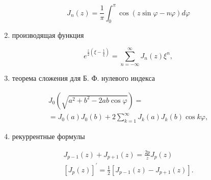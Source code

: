 \documentclass[10pt]{article}
\begin{document}
\[

J_{n}(z)=\frac{1}{\pi} \int_{0}^{\pi} \cos (z \sin \varphi-n \varphi) d \varphi

\]



\begin{enumerate}

  \setcounter{enumi}{1}

  \item производящая функция

\end{enumerate}



\[

e^{\frac{z}{2}\left(\xi-\frac{1}{\xi}\right)}=\sum_{n=-\infty}^{\infty} J_{n}(z) \xi^{n},

\]



\begin{enumerate}

  \setcounter{enumi}{2}

  \item теорема сложения для Б. Ф. нулевого индекса

\end{enumerate}



\[

\begin{gathered}

J_{0}\left(\sqrt{a^{2}+b^{2}-2 a b \cos \varphi}\right)= \\

=J_{0}(a) J_{0}(b)+2 \sum_{k=1}^{\infty} J_{k}(a) J_{k}(b) \cos k \varphi,

\end{gathered}

\]



\begin{enumerate}

  \setcounter{enumi}{3}

  \item рекуррентные формулы

\end{enumerate}



\[

\begin{gathered}

J_{p-1}(z)+J_{p+1}(z)=\frac{2 p}{z} J_{p}(z) \\

{\left[J_{p}(z)\right]^{\prime}=\frac{1}{2}\left[J_{p-1}(z)-J_{p+1}(z)\right] .}

\end{gathered}

\]
\end{document}
